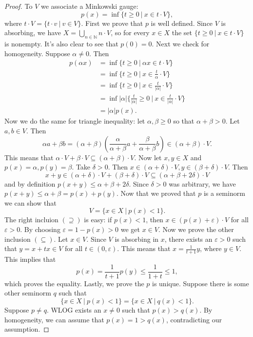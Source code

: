\documentclass[10pt, a4paper]{article}
\newenvironment{noticeC}{%
  \tcolorbox[%
  notitle,
  empty,
  enhanced,  %
  breakable,
  coltext=black, 
  fontupper=\rmfamily,
  noparskip,
  sharp corners,
  boxrule=-1pt,  %
  frame hidden,
  left=7pt,  %
  right=7pt,
  top=5pt,
  bottom=5pt,
  before skip=2.5ex plus 2pt,
  after skip=2.5ex plus 2pt,
  overlay unbroken and last={%
  },
  ]}
{\endtcolorbox}
\newenvironment{myproof}%
  {\begin{noticeC}\begin{proof}}%
  {\end{proof}\end{noticeC}}
\newcommand{\N}{\mathbb {N}}
\begin{document}
\begin{myproof}
  To $V$ we associate a Minkowski gauge:
  $$p(x) = \inf \{t \geq 0\ |\ x \in t \cdot V\},$$
  where $t \cdot V = \{t \cdot v\ |\ v \in V\}$.
  First we prove that $p$ is well defined.
  Since $V$ is absorbing, we have $X = \bigcup_{n \in \N} n \cdot V$,
  so for every $x \in X$ the set $\{t \geq 0\ |\ x \in t \cdot V\}$
  is nonempty. It's also clear to see that $p(0) = 0$.
  Next we check for homogeneity. Suppose $\alpha \neq 0$.
  Then 
  \begin{align*}
    p(\alpha x) &= \inf \{t \geq 0\ |\ \alpha x \in t\cdot V\}\\
    &= \inf \{t \geq 0\ |\ x \in \frac{t}{\alpha}\cdot V\}\\
    &= \inf \{t \geq 0\ |\ x \in \frac{t}{|\alpha|}\cdot V\}\\
    &= \inf |\alpha| \{\frac{t}{|\alpha|} \geq 0\ |\ x \in \frac{t}{|\alpha|}\cdot V\}\\
    &= |\alpha| p(x).
  \end{align*}
  Now we do the same for triangle inequality:
  let $\alpha, \beta \geq 0$ so that $\alpha + \beta > 0$.
  Let $a, b \in V$. Then 
  $$\alpha a + \beta b = (\alpha + \beta) \left(\frac{\alpha}{\alpha + \beta} a + \frac{\beta}{\alpha + \beta} b\right) \in (\alpha + \beta) \cdot V.$$
  This means that $\alpha \cdot V + \beta \cdot V \subseteq (\alpha + \beta) \cdot V$.
  Now let $x, y \in X$ and $p(x) = \alpha, p(y) = \beta$.
  Take $\delta > 0$. Then $x \in (\alpha + \delta) \cdot V, y \in (\beta + \delta) \cdot V$.
  Then $$x + y \in (\alpha + \delta) \cdot V + (\beta + \delta) \cdot V \subseteq (\alpha + \beta + 2 \delta) \cdot V$$
  and by definition $p(x + y) \leq \alpha + \beta + 2 \delta$.
  Since $\delta > 0$ was arbitrary, we have $p(x + y) \leq \alpha + \beta = p(x) + p(y)$.
  Now that we proved that $p$ is a seminorm we can show that 
  $$V = \{x \in X\ |\ p(x) < 1\}.$$
  The right incluion $(\supseteq)$ is easy: if $p(x) < 1$, then $x \in (p(x) + \varepsilon) \cdot V$
  for all $\varepsilon > 0$. By choosing $\varepsilon = 1 - p(x) > 0$ we get $x \in V$.
  Now we prove the other inclusion $(\subseteq)$. Let $x \in V$.
  Since $V$ is absorbing in $x$, there exists an $\varepsilon > 0$ such that 
  $y = x + tx \in V$ for all $t \in (0, \varepsilon)$. This means that $x = \frac{1}{t + 1} y$, where $y \in V$.
  This implies that 
  $$p(x) = \frac{1}{t + 1} p(y) \leq \frac{1}{1 + t} \leq 1,$$
  which proves the equality. Lastly, we prove the $p$ is unique.
  Suppose there is some other seminorm $q$ such that 
  $$\{x \in X\ |\ p(x) < 1\} = \{x \in X\ |\ q(x) < 1\}.$$
  Suppose $p \neq q$. WLOG exists an $x \neq 0$ such that $p(x) > q(x)$.
  By homogeneity, we can assume that $p(x) = 1 > q(x)$, contradicting our assumption.
\end{myproof}
\end{document}

